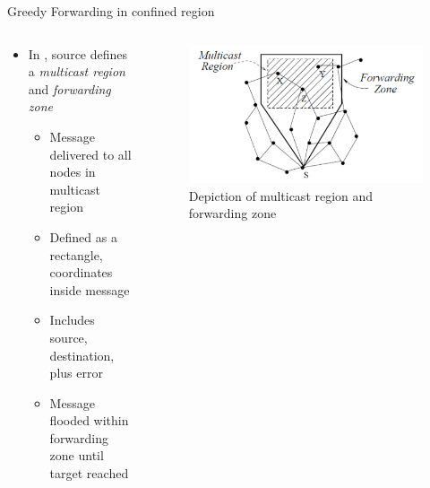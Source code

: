 \documentclass[pdftex]{beamer}
\begin{document}
\begin{frame}{Greedy Forwarding in confined region}
\begin{columns}
\begin{column}{.5\textwidth}
\begin{itemize}
	\item In \cite{749282}, source defines a \emph{multicast region} and \emph{forwarding zone}
		\begin{itemize}
			\item Message delivered to all nodes in multicast region
			\item Defined as a rectangle, coordinates inside message
			\item Includes source, destination, plus error
			\item Message flooded within forwarding zone until target reached
		\end{itemize}
\end{itemize}
\end{column}

\begin{column}{.5\textwidth}
\begin{figure}
\centering
\includegraphics[width=\textwidth]{geocast_region}
\caption{Depiction of multicast region and forwarding zone}
\end{figure}
\end{column}
\end{columns}
\end{frame}
\end{document}
